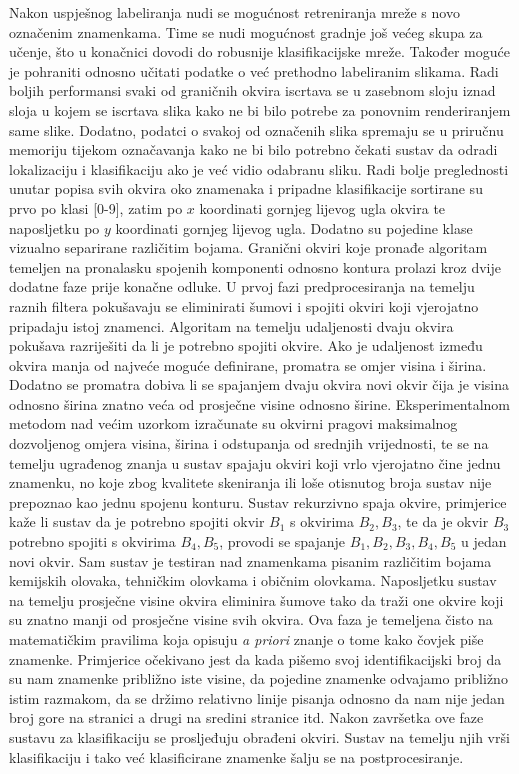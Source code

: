 \documentclass[times, utf8, diplomski]{fer}
\theoremstyle{definition}
\begin{document}
Nakon uspješnog labeliranja nudi se mogućnost retreniranja mreže s novo označenim znamenkama. Time se nudi mogućnost gradnje još većeg skupa za učenje, što u konačnici dovodi do robusnije klasifikacijske mreže. Također moguće je pohraniti odnosno učitati podatke o već prethodno labeliranim slikama. Radi boljih performansi svaki od graničnih okvira iscrtava se u zasebnom sloju iznad sloja u kojem se iscrtava slika kako ne bi bilo potrebe za ponovnim renderiranjem same slike. Dodatno, podatci o svakoj od označenih slika spremaju se u priručnu memoriju tijekom označavanja kako ne bi bilo potrebno čekati sustav da odradi lokalizaciju i klasifikaciju ako je već vidio odabranu sliku. Radi bolje preglednosti unutar popisa svih okvira oko znamenaka i pripadne klasifikacije sortirane su prvo po klasi [0-9], zatim po $x$ koordinati gornjeg lijevog ugla okvira te naposljetku po $y$ koordinati gornjeg lijevog ugla. Dodatno su pojedine klase vizualno separirane različitim bojama. \newline
Granični okviri koje pronađe algoritam temeljen na pronalasku spojenih komponenti odnosno kontura prolazi kroz dvije dodatne faze prije konačne odluke. U prvoj fazi predprocesiranja na temelju raznih filtera pokušavaju se eliminirati šumovi i spojiti okviri koji vjerojatno pripadaju istoj znamenci. Algoritam na temelju udaljenosti dvaju okvira pokušava razriješiti da li je potrebno spojiti okvire. Ako je udaljenost između okvira manja od najveće moguće definirane, promatra se omjer visina i širina. Dodatno se promatra dobiva li se spajanjem dvaju okvira novi okvir čija je visina odnosno širina znatno veća od prosječne visine odnosno širine. Eksperimentalnom metodom nad većim uzorkom izračunate su okvirni pragovi maksimalnog dozvoljenog omjera visina, širina i odstupanja od srednjih vrijednosti, te se na temelju ugrađenog znanja u sustav spajaju okviri koji vrlo vjerojatno čine jednu znamenku, no koje zbog kvalitete skeniranja ili loše otisnutog broja sustav nije prepoznao kao jednu spojenu konturu. Sustav rekurzivno spaja okvire, primjerice kaže li sustav da je potrebno spojiti okvir $B_1$ s okvirima $B_2, B_3$, te da je okvir $B_3$ potrebno spojiti s okvirima $B_4, B_5$, provodi se spajanje $B_1, B_2, B_3, B_4, B_5$ u jedan novi okvir. Sam sustav je testiran nad znamenkama pisanim različitim bojama kemijskih olovaka, tehničkim olovkama i običnim olovkama. Naposljetku sustav na temelju prosječne visine okvira eliminira šumove tako da traži one okvire koji su znatno manji od prosječne visine svih okvira. Ova faza je temeljena čisto na matematičkim pravilima koja opisuju \textit{a priori} znanje o tome kako čovjek piše znamenke. Primjerice očekivano jest da kada pišemo svoj identifikacijski broj da su nam znamenke približno iste visine, da pojedine znamenke odvajamo približno istim razmakom, da se držimo relativno linije pisanja odnosno da nam nije jedan broj gore na stranici a drugi na sredini stranice itd. Nakon završetka ove faze sustavu za klasifikaciju se prosljeđuju obrađeni okviri. Sustav na temelju njih vrši klasifikaciju i tako već klasificirane znamenke šalju se na postprocesiranje. \newline
\end{document}
